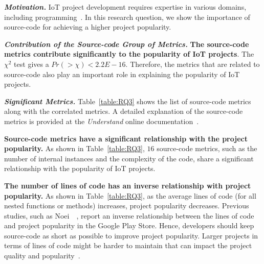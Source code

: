 

\noindent \textbf{\RQthree}



\vspace{0.1cm}

\noindent\textbf{\textit{Motivation.}}
IoT project development requires expertise in various domains, including programming~\cite{gyrard2015assisting,conzon2015industrial}.
In this research question, we show the importance of source-code for achieving a higher project popularity.

\vspace{0.1cm}

\noindent\textbf{\textit{Contribution of the Source-code Group of Metrics.}} \textbf{The source-code metrics contribute significantly to the popularity of IoT    projects}. The $\chi^2$ test gives a $Pr(>\chi)<2.2E-16$. Therefore, the metrics that are related to source-code also play an important role in
explaining the popularity of IoT projects.

\vspace{0.1cm}




\noindent\textbf{\textit{Significant Metrics.}} Table~\ref{table:RQ3} shows the
list of source-code metrics along with the correlated metrics. A detailed
explanation of the source-code metrics is provided at the {\em Understand}
online documentation~\cite{understandmetrics}.

\textbf{Source-code metrics have a significant relationship with the project popularity.} As shown in Table~\ref{table:RQ3}, $16$ source-code metrics, such as the number of internal instances
and the complexity of the code, share a significant relationship with the popularity of IoT projects.

\textbf{The number of lines of code has an inverse relationship with project
	popularity.} As shown in Table~\ref{table:RQ3}, as the average lines of code
(for all nested functions or methods) increases, project popularity
decreases. Previous studies, such as Noei~\etal~\cite{noei2017study}, report an
inverse relationship between the lines of code and project popularity in the Google Play Store. Hence, developers should keep source-code
as short as possible to improve project popularity.
Larger projects in terms of lines of code might be harder to maintain that can impact the project quality and popularity~\cite{li1993object,noei2017study}.


